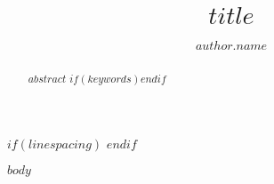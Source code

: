 \documentclass[$for(classoption)$$classoption$$sep$,$endfor$]{wiley-article}
\title{$title$}
\author[$if(author.address)$$author.label$$else$1$endif$$if(author.presentadd)$\authfn{1}$endif$$if(author.footnote)$\authfn{2}$endif$]{$author.name$}
\begin{document}
\maketitle

\begin{abstract}
$abstract$
$if(keywords)$$endif$
\end{abstract}

$if(linespacing)$
$endif$

$body$

\printendnotes




\end{document}

